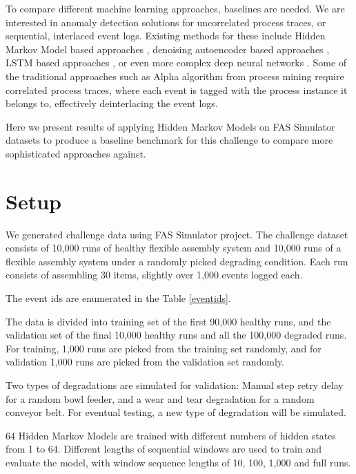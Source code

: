 \documentclass[journal]{IEEEtran}
\begin{document}
To compare different machine learning approaches, baselines are needed. We are interested in anomaly detection solutions for uncorrelated process traces, or sequential, interlaced event logs. Existing methods for these include Hidden Markov Model based approaches \cite{gornitz2015hidden}\cite{joshi2005investigating}, denoising autoencoder based approaches \cite{nolle2016unsupervised}, LSTM based approaches \cite{yuan2021recompose}\cite{du2017deeplog}, or even more complex deep neural networks \cite{zhang2019robust}. Some of the traditional approaches such as Alpha algorithm from process mining require correlated process traces, where each event is tagged with the process instance it belongs to, effectively deinterlacing the event logs.

Here we present results of applying Hidden Markov Models on FAS Simulator datasets to produce a baseline benchmark for this challenge to compare more sophisticated approaches against.

\section{Setup}

We generated challenge data using FAS Simulator project\cite{FASSimulator}. The challenge dataset consists of 10,000 runs of healthy flexible assembly system and 10,000 runs of a flexible assembly system under a randomly picked degrading condition. Each run consists of assembling 30 items, slightly over 1,000 events logged each.

The event ids are enumerated in the Table \ref{eventids}. 

The data is divided into training set of the first 90,000 healthy runs, and the validation set of the final 10,000 healthy runs and all the 100,000 degraded runs. For training, 1,000 runs are picked from the training set randomly, and for validation 1,000 runs are picked from the validation set randomly.

Two types of degradations are simulated for validation: Manual step retry delay for a random bowl feeder, and a wear and tear degradation for a random conveyor belt. For eventual testing, a new type of degradation will be simulated.

64 Hidden Markov Models are trained with different numbers of hidden states from 1 to 64. Different lengths of sequential windows are used to train and evaluate the model, with window sequence lengths of 10, 100, 1,000 and full runs.
\end{document}
